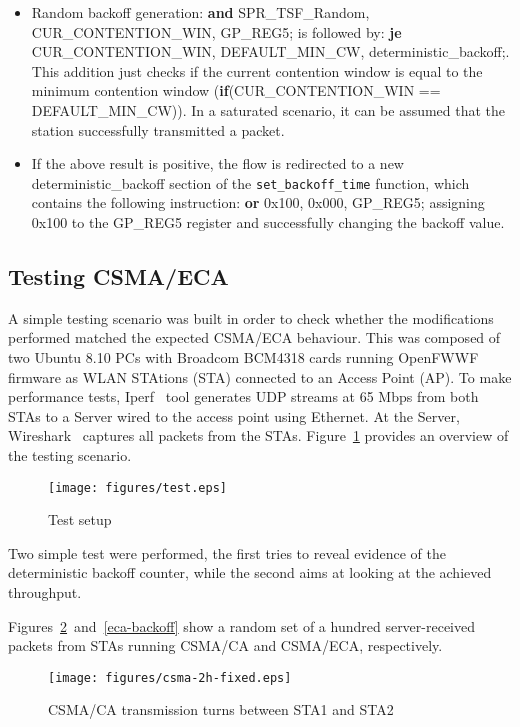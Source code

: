 \documentclass[conference]{IEEEtran}
\begin{document}
\begin{itemize}
	\item Random backoff generation: {\bf and} SPR\_TSF\_Random, CUR\_CONTENTION\_WIN, GP\_REG5; is followed by: {\bf je} CUR\_CONTENTION\_WIN, DEFAULT\_MIN\_CW, deterministic\_backoff;. \\
	This addition just checks if the current contention window is equal to the minimum contention window ({\bf if}(CUR\_CONTENTION\_WIN == DEFAULT\_MIN\_CW)). In a saturated scenario, it can be assumed that the station successfully transmitted a packet.
	\item If the above result is positive, the flow is redirected to a new deterministic\_backoff section of the \texttt{set\_backoff\_time} function, which contains the following instruction: {\bf or} 0x100, 0x000, GP\_REG5; assigning 0x100 to the GP\_REG5 register and successfully changing the backoff value.
\end{itemize}

\subsection{Testing CSMA/ECA}
A simple testing scenario was built in order to check whether the modifications performed matched the expected CSMA/ECA behaviour. This was composed of two Ubuntu 8.10 PCs with Broadcom BCM4318 cards running OpenFWWF firmware as WLAN STAtions (STA) connected to an Access Point (AP). To make performance tests, Iperf~\cite{tirumala2005iperf} tool generates UDP streams at 65 Mbps from both STAs to a Server wired to the access point using Ethernet. At the Server, Wireshark~\cite{combs2007wireshark} captures all packets from the STAs. Figure~\ref{setup} provides an overview of the testing scenario.

\begin{figure}[htbp]
\centering
  \texttt{[image: figures/test.eps]}
  \caption{Test setup}
  \label{setup}
\end{figure}

Two simple test were performed, the first tries to reveal evidence of the deterministic backoff counter, while the second aims at looking at the achieved throughput. 

Figures~\ref{ca-backoff}~and~\ref{eca-backoff} show a random set of a hundred server-received packets from STAs running CSMA/CA and CSMA/ECA, respectively.

\begin{figure}[htbp]
\centering
  \texttt{[image: figures/csma-2h-fixed.eps]}
  \caption{CSMA/CA transmission turns between STA1 and STA2}
  \label{ca-backoff}
\end{figure}
\end{document}
